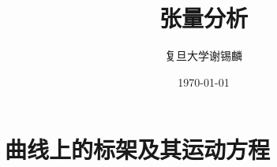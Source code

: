 \documentclass[oneside]{book}
\title{
	\vspace{-4 cm} \color{Sienna} \Huge 张量分析
}
\author{
	\CJKfamily{楷体} \color{DarkRed} \Large
	复旦大学\phantom{空格}谢锡麟
}
\date{
	\CJKfamily{楷体} \color{Goldenrod} \Large \today
}
\theoremstyle{nonumberplain} %
\begin{document}
%	
%	
%		
%	
%		
%	
%		
%	
%		
%	
%		
%	
	\chapter{曲线上的标架及其运动方程}
		
%		
\end{document}
